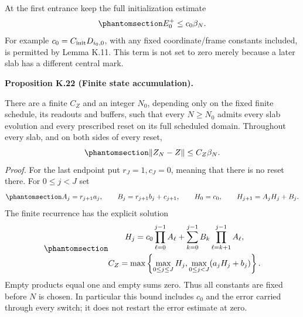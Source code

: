 \documentclass[
  english,
  11pt,
  reqno]{amsart}
\makeatletter
\newcommand{\pandocstatementheading}[1]{%
  \par\addpenalty{\@beginparpenalty}%
  \addvspace{.5\baselineskip plus .2\baselineskip minus .2\baselineskip}%
  {\normalfont\bfseries #1\par}%
  \nobreak\@afterindenttrue\@afterheading
}
\makeatother
\begin{document}
At the first entrance keep the full initialization estimate
\begin{equation}\protect\phantomsection\label{eq:fr-opt-c-initial-error}{
 E_0^+\le c_0\beta_N.
}\end{equation} For example \(c_0=C_{\rm init}D_{i_0,0}\), with any
fixed coordinate/frame constants included, is permitted by Lemma K.11.
This term is not set to zero merely because a later slab has a different
central mark.

\pandocstatementheading{\protect{}\label{prop:fr-opt-c-state-accumulation}Proposition K.22 (Finite state accumulation).}

There are a finite \(C_Z\) and an integer \(N_0\), depending only on the
fixed finite schedule, its readouts and buffers, such that every
\(N\ge N_0\) admits every slab evolution and every prescribed reset on
its full scheduled domain. Throughout every slab, and on both sides of
every reset,
\begin{equation}\protect\phantomsection\label{eq:fr-opt-c-global-state}{
 \|Z_N-Z\|\le C_Z\beta_N.
}\end{equation} \emph{Proof.} For the last endpoint put \(r_J=1,c_J=0\),
meaning that there is no reset there. For \(0\le j<J\) set
\begin{equation}\protect\phantomsection\label{eq:fr-opt-c-state-majorant-recursion}{
 A_j=r_{j+1}a_j,\qquad
 B_j=r_{j+1}b_j+c_{j+1},\qquad
 H_0=c_0,\qquad H_{j+1}=A_jH_j+B_j.
}\end{equation} The finite recurrence has the explicit solution
\begin{equation}\protect\phantomsection\label{eq:fr-opt-c-state-product-sum}{\begin{gathered}
H_j=c_0\prod_{\ell=0}^{j-1}A_\ell
     +\sum_{k=0}^{j-1}B_k
                    \prod_{\ell=k+1}^{j-1}A_\ell, \\
C_Z=\max\left\{\max_{0\le j\le J}H_j,
                  \max_{0\le j<J}(a_jH_j+b_j)\right\}.
\end{gathered}}\end{equation} Empty products equal one and empty sums zero. Thus all
constants are fixed before \(N\) is chosen. In particular this bound
includes \(c_0\) and the error carried through every switch; it does not
restart the error estimate at zero.
\end{document}
